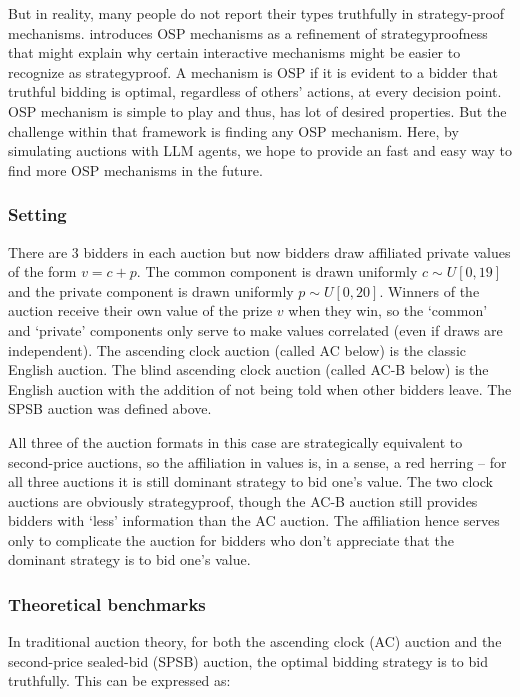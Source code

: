 \documentclass{article} %
\begin{document}
But in reality, many people do not report their types truthfully in strategy-proof mechanisms. 
\cite{li2017obviously} introduces OSP mechanisms as a refinement of strategyproofness that might explain why certain interactive mechanisms might be easier to recognize as strategyproof.
A mechanism is OSP if it is evident to a bidder that truthful bidding is optimal, regardless of others' actions, at every decision point.
OSP mechanism is simple to play and thus, has lot of desired properties. 
But the challenge within that framework is finding any OSP mechanism. 
Here, by simulating auctions with LLM agents, we hope to provide an fast and easy way to find more OSP mechanisms in the future.


\subsubsection{Setting}
There are $3$ bidders in each auction but now bidders draw affiliated private values of the form $v = c + p$. 
The common component is drawn uniformly $c \sim U[0, 19]$ and the private component is drawn uniformly $p \sim U[0, 20]$. 
Winners of the auction receive their own value of the prize $v$ when they win, so the `common' and `private' components only serve to make values correlated (even if draws are independent). 
The ascending clock auction (called AC below) is the classic English auction. 
The blind ascending clock auction (called AC-B below) is the English auction with the addition of not being told when other bidders leave. 
The SPSB auction was defined above. 

All three of the auction formats in this case are strategically equivalent to second-price auctions, so the affiliation in values is, in a sense, a red herring -- for all three auctions it is still dominant strategy to bid one's value. 
The two clock auctions are obviously strategyproof, though the AC-B auction still provides bidders with `less' information than the AC auction. 
The affiliation hence serves only to complicate the auction for bidders who don't appreciate that the dominant strategy is to bid one's value. 

\subsubsection{Theoretical benchmarks}

In traditional auction theory, for both the ascending clock (AC) auction and the second-price sealed-bid (SPSB) auction, the optimal bidding strategy is to bid truthfully. This can be expressed as:
\end{document}
